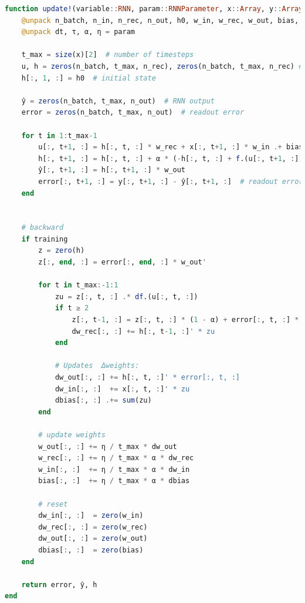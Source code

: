 \begin{lstlisting}[language=julia]
function update!(variable::RNN, param::RNNParameter, x::Array, y::Array, training::Bool)
    @unpack n_batch, n_in, n_rec, n_out, h0, w_in, w_rec, w_out, bias, dw_in, dw_rec, dw_out, dbias = variable 
    @unpack dt, τ, α, η = param

    t_max = size(x)[2]  # number of timesteps
    u, h = zeros(n_batch, t_max, n_rec), zeros(n_batch, t_max, n_rec) # input (feedforward + recurrent), time-dependent RNN activity vector
    h[:, 1, :] = h0  # initial state

    ŷ = zeros(n_batch, t_max, n_out)  # RNN output
    error = zeros(n_batch, t_max, n_out)  # readout error

    for t in 1:t_max-1
        u[:, t+1, :] = h[:, t, :] * w_rec + x[:, t+1, :] * w_in .+ bias
        h[:, t+1, :] = h[:, t, :] + α * (-h[:, t, :] + f.(u[:, t+1, :]))
        ŷ[:, t+1, :] = h[:, t+1, :] * w_out 
        error[:, t+1, :] = y[:, t+1, :] - ŷ[:, t+1, :]  # readout error
    end
    
    
    # backward
    if training 
        z = zero(h)
        z[:, end, :] = error[:, end, :] * w_out' 

        for t in t_max:-1:1
            zu = z[:, t, :] .* df.(u[:, t, :])
            if t ≥ 2
                z[:, t-1, :] = z[:, t, :] * (1 - α) + error[:, t, :] * w_out' + zu * w_rec * α
                dw_rec[:, :] += h[:, t-1, :]' * zu
            end

            # Updates  Δweights:
            dw_out[:, :] += h[:, t, :]' * error[:, t, :]
            dw_in[:, :]  += x[:, t, :]' * zu
            dbias[:, :] .+= sum(zu)
        end
        
        # update weights
        w_out[:, :] += η / t_max * dw_out
        w_rec[:, :] += η / t_max * α * dw_rec
        w_in[:, :]  += η / t_max * α * dw_in
        bias[:, :]  += η / t_max * α * dbias
        
        # reset
        dw_in[:, :]  = zero(w_in)
        dw_rec[:, :] = zero(w_rec)
        dw_out[:, :] = zero(w_out)
        dbias[:, :]  = zero(bias)
    end

    return error, ŷ, h
end
\end{lstlisting}

